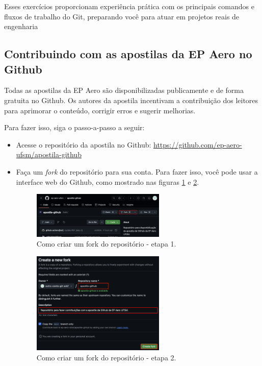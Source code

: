 Esses exercícios proporcionam experiência prática com os principais comandos e fluxos de trabalho do Git, preparando você para atuar em projetos reais de engenharia

\subsection{Contribuindo com as apostilas da EP Aero no Github}

Todas as apostilas da EP Aero são disponibilizadas publicamente e de forma gratuita no Github. Os autores da apostila incentivam a contribuição dos leitores para aprimorar o conteúdo, corrigir erros e sugerir melhorias.

Para fazer isso, siga o passo-a-passo a seguir:

\begin{itemize}
        \item Acesse o repositório da apostila no Github: \url{https://github.com/ep-aero-ufsm/apostila-github}
        \item Faça um \textit{fork} do repositório para sua conta. Para fazer isso, você pode usar a interface web do Github, como mostrado nas figuras \ref{fig:1_fork} e \ref{fig:2_fork}.
\begin{figure}[H]
        \centering
        \includegraphics[width=0.6\textwidth]{imgs/tutorial_contribuicao/1_fork.png}
        \caption{Como criar um fork do repositório - etapa 1.}
        \label{fig:1_fork}
    \end{figure}

    \begin{figure}[H]
        \centering
        \includegraphics[width=0.6\textwidth]{imgs/tutorial_contribuicao/2_fork.png}
        \caption{Como criar um fork do repositório - etapa 2.}
        \label{fig:2_fork}
    \end{figure}


\end{itemize}
